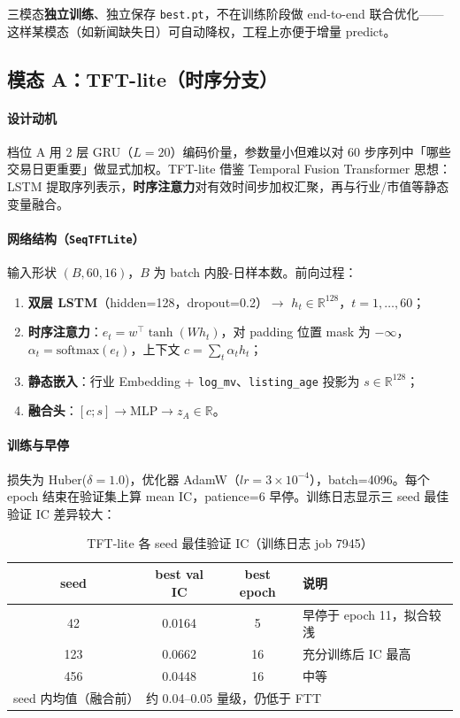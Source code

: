 \documentclass[UTF8,a4paper,12pt]{ctexart}
\begin{document}
三模态\textbf{独立训练}、独立保存 \texttt{best.pt}，不在训练阶段做 end-to-end 联合优化——这样某模态（如新闻缺失日）可自动降权，工程上亦便于增量 predict。

\subsection{模态 A：TFT-lite（时序分支）}

\paragraph{设计动机}

档位 A 用 2 层 GRU（$L=20$）编码价量，参数量小但难以对 60 步序列中「哪些交易日更重要」做显式加权。TFT-lite 借鉴 Temporal Fusion Transformer 思想：LSTM 提取序列表示，\textbf{时序注意力}对有效时间步加权汇聚，再与行业/市值等静态变量融合。

\paragraph{网络结构（\texttt{SeqTFTLite}）}

输入形状 $(B, 60, 16)$，$B$ 为 batch 内股-日样本数。前向过程：
\begin{enumerate}[leftmargin=2em]
  \item \textbf{双层 LSTM}（hidden=128，dropout=0.2）$\to$ $h_t \in \mathbb{R}^{128}$，$t=1,\ldots,60$；
  \item \textbf{时序注意力}：$e_t = w^\top \tanh(W h_t)$，对 padding 位置 mask 为 $-\infty$，
  $\alpha_t = \mathrm{softmax}(e_t)$，上下文 $c = \sum_t \alpha_t h_t$；
  \item \textbf{静态嵌入}：行业 Embedding + \texttt{log\_mv}、\texttt{listing\_age} 投影为 $s \in \mathbb{R}^{128}$；
  \item \textbf{融合头}：$[c; s] \to \mathrm{MLP} \to z_A \in \mathbb{R}$。
\end{enumerate}

\paragraph{训练与早停}

损失为 Huber($\delta=1.0$)，优化器 AdamW（$lr=3\times10^{-4}$），batch=4096。每个 epoch 结束在验证集上算 mean IC，patience=6 早停。训练日志显示三 seed 最佳验证 IC 差异较大：

\begin{table}[H]
\centering
\caption{TFT-lite 各 seed 最佳验证 IC（训练日志 job 7945）}
\label{tab:tft-seed}
\begin{tabular}{cccl}
\toprule
\textbf{seed} & \textbf{best val IC} & \textbf{best epoch} & \textbf{说明} \\
\midrule
42  & 0.0164 & 5  & 早停于 epoch 11，拟合较浅 \\
123 & 0.0662 & 16 & 充分训练后 IC 最高 \\
456 & 0.0448 & 16 & 中等 \\
\midrule
seed 内均值（融合前） & \multicolumn{3}{l}{约 0.04--0.05 量级，仍低于 FTT} \\
\bottomrule
\end{tabular}
\end{table}
\end{document}
